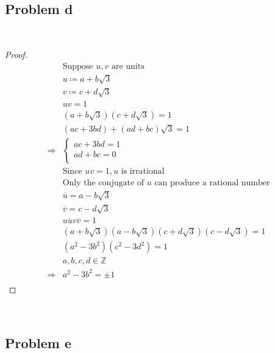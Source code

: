 \documentclass{article}
\begin{document}
~

\subsection*{Problem d}

~

\begin{proof}
    \begin{align*}
        &\text{Suppose }u,v\text{ are units}\\
        &u\coloneqq a+b\sqrt{3}\\
        &v\coloneqq c+d\sqrt{3}\\
        &uv=1\\
        &(a+b\sqrt{3})(c+d\sqrt{3})=1\\
        &(ac+3bd)+(ad+bc)\sqrt{3}=1\\
        \Rightarrow&\begin{cases}
            ac+3bd=1\\
            ad+bc=0\\
        \end{cases}\\
        &\text{Since }uv=1,u \text{ is irrational}\\
        &\text{Only the conjugate of }u\text{ can produce a rational number}\\
        &\overline{u}=a-b\sqrt{3}\\
        &\overline{v}=c-d\sqrt{3}\\
        &u\overline{u}v\overline{v}=1\\
        &(a+b\sqrt{3})(a-b\sqrt{3})(c+d\sqrt{3})(c-d\sqrt{3})=1\\
        &(a^2-3b^2)(c^2-3d^2)=1\\
        &a,b,c,d\in\mathbb{Z} \\
        \Rightarrow&a^2-3b^2=\pm 1\\
    \end{align*}
\end{proof}

~

\subsection*{Problem e}

~
\end{document}
